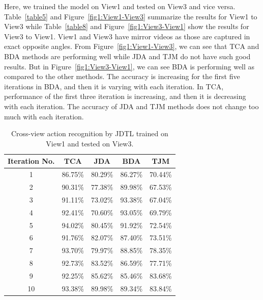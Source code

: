 Here, we trained the model on View1 and tested on View3 and vice versa. Table~\ref	{table5} and Figure~\ref{fig1:View1-View3} summarize the results for View1 to View3 while Table~\ref{table8} and Figure~\ref{fig1:View3-View1} show the results for View3 to View1. View1 and View3 have mirror videos as those are captured in exact opposite angles. From Figure~\ref{fig1:View1-View3}, we can see that TCA and BDA methods are performing well while JDA and TJM do not have such good results. But in Figure~\ref{fig1:View3-View1}, we can see BDA is performing well as compared to the other methods. The accuracy is increasing for the first five iterations in BDA, and then it is varying with each iteration. In TCA, performance of the first three iteration is increasing, and then it is decreasing with each iteration. The accuracy of JDA and TJM methods does not change too much with each iteration.
\begin{table}[hbt!]
	\centering
	\caption{Cross-view action recognition by JDTL trained on View1 and tested on View3.} 
		\begin{tabular}{@{\extracolsep{12pt}}ccccc}
			\toprule   
			Iteration No. &  TCA & JDA & BDA & TJM\\ 
			\hline
			\midrule
			1&	86.75\%&	80.29\%&	86.27\%&	70.44\%\\
			2&	90.31\%&	77.38\%&	89.98\%&	67.53\%\\
			3&	91.11\%&	73.02\%&	93.38\%&	67.04\%\\
			4&	92.41\%&	70.60\%&	93.05\%&	69.79\%\\
			5&	94.02\%&	80.45\%&	91.92\%&	72.54\%\\
			6&	91.76\%&	82.07\%&	87.40\%&	73.51\%\\
			7&	93.70\%&	79.97\%&	88.85\%&	78.35\%\\
			8&	92.73\%&	83.52\%&	86.59\%&	77.71\%\\
			9&	92.25\%&	85.62\%&	85.46\%&	83.68\%\\
			10&	93.38\%&	89.98\%&	89.34\%&	83.84\%\\
			\bottomrule
			\hline
			\midrule
		\end{tabular}%
	\label{table6}
\end{table}

